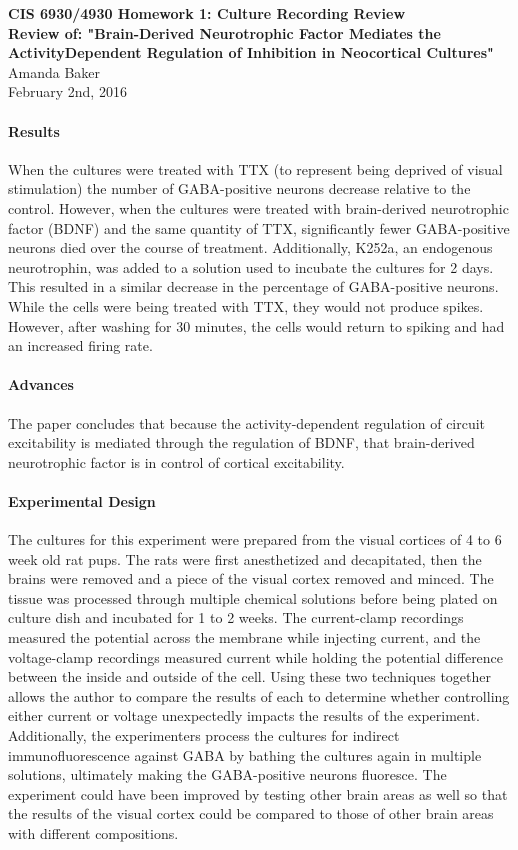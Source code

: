 \documentclass[11pt]{article}
\begin{document}
\begin{center}
{\large {\bf CIS 6930/4930 Homework 1: Culture Recording Review}}\\
{\normalsize {\bf Review of: "Brain-Derived Neurotrophic Factor Mediates the ActivityDependent
Regulation of Inhibition in Neocortical Cultures"}}\\
Amanda Baker \\
February 2nd, 2016 \\
\end{center}

\paragraph{Results}
When the cultures were treated with TTX (to represent being deprived of visual stimulation)
the number of GABA-positive neurons decrease relative to the control.  However,
when the cultures were treated with brain-derived neurotrophic factor (BDNF) and
the same quantity of TTX, significantly
fewer GABA-positive neurons died over the course of treatment.  Additionally, K252a,
an endogenous neurotrophin, was added to a solution used to incubate the cultures
for 2 days.  This resulted in a similar decrease in the percentage of GABA-positive
neurons.  While the cells were being treated with TTX, they would not produce spikes.
However, after washing for 30 minutes, the cells would return to spiking and had
an increased firing rate.

\paragraph{Advances}
The paper concludes that because the activity-dependent regulation of circuit excitability
is mediated through the regulation of BDNF, that brain-derived neurotrophic factor
is in control of cortical excitability.

\paragraph{Experimental Design}
The cultures for this experiment were prepared from the visual cortices of 4 to 6
week old rat pups.  The rats were first anesthetized and decapitated, then the brains
were removed and a piece of the visual cortex removed and minced.  The tissue was
processed through multiple chemical solutions before being plated on culture dish
and incubated for 1 to 2 weeks.  The current-clamp recordings measured the potential
across the membrane while injecting current, and the voltage-clamp recordings measured
current while holding the potential difference between the inside and outside of
the cell.  Using these two techniques together allows the author to compare the
results of each to determine whether controlling either current or voltage unexpectedly
impacts the results of the experiment.  Additionally, the experimenters process
the cultures for indirect immunofluorescence against GABA by bathing the cultures
again in multiple solutions, ultimately making the GABA-positive neurons fluoresce.
The experiment could have been improved by testing other brain areas as well so
that the results of the visual cortex could be compared to those of other brain
areas with different compositions.
\end{document}
